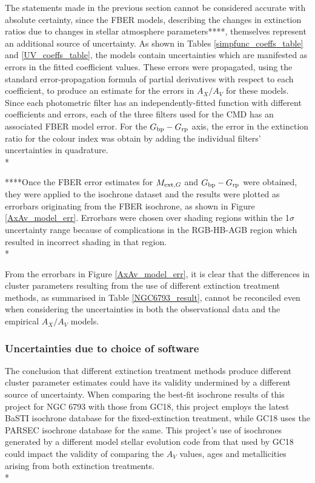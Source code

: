 \documentclass[12pt, a4paper]{report}
\begin{document}
The statements made in the previous section cannot be considered accurate with absolute certainty, since the FBER models, describing the changes in extinction ratios due to changes in stellar atmosphere parameters****, themselves represent an additional source of uncertainty. As shown in Tables \ref{simpfunc_coeffs_table} and \ref{UV_coeffs_table}, the models contain uncertainties which are manifested as errors in the fitted coefficient values. These errors were propagated, using the standard error-propagation formula of partial derivatives with respect to each coefficient, to produce an estimate for the errors in $A_{X}/A_{V}$ for these models. Since each photometric filter has an independently-fitted function with different coefficients and errors, each of the three filters used for the CMD has an associated FBER model error. For the $G_{\textnormal{bp}}-G_{\textnormal{rp}}$ axis, the error in the extinction ratio for the colour index was obtain by adding the individual filters' uncertainties in quadrature.\\*

****Once the FBER error estimates for $M_{\textnormal{ext},G}$ and $G_{\textnormal{bp}}-G_{\textnormal{rp}}$ were obtained, they were applied to the isochrone dataset and the results were plotted as errorbars originating from the FBER isochrone, as shown in Figure \ref{AxAv_model_err}. Errorbars were chosen over shading regions within the 1$\sigma$ uncertainty range because of complications in the RGB-HB-AGB region which resulted in incorrect shading in that region.\\*


From the errorbars in Figure \ref{AxAv_model_err}, it is clear that the differences in cluster parameters resulting from the use of different extinction treatment methods, as summarised in Table \ref{NGC6793_result}, cannot be reconciled even when considering the uncertainties in both the observational data and the empirical $A_{X}/A_{V}$ models.

\subsubsection{Uncertainties due to choice of software}

The conclusion that different extinction treatment methods produce different cluster parameter estimates could have its validity undermined by a different source of uncertainty. When comparing the best-fit isochrone results of this project for NGC 6793 with those from GC18, this project employs the latest BaSTI isochrone database \citep{2018ApJ...856..125H} for the fixed-extinction treatment, while GC18 uses the PARSEC isochrone database \citep{2017ApJ...835...77M} for the same. This project's use of isochrones generated by a different model stellar evolution code from that used by GC18 could impact the validity of comparing the $A_{V}$ values, ages and metallicities arising from both extinction treatments.\\*
\end{document}
